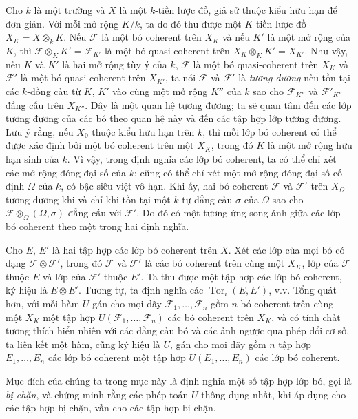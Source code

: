 Cho $k$ là một trường và $X$ là một $k$-tiền lược đồ, giả sử thuộc kiểu hữu hạn
để đơn giản. Với mỗi mở rộng $K/k$, ta do đó thu được một $K$-tiền lược đồ
$X_K=X\otimes_k K$. Nếu $\mathcal F$ là một bó coherent trên $X_K$ và nếu
$K'$ là một mở rộng của $K$, thì
$\mathcal F\otimes_K K'=\mathcal F_{K'}$ là một bó quasi-coherent trên
$X_K\otimes_K K'=X_{K'}$. Như vậy, nếu $K$ và $K'$ là hai mở rộng tùy ý của
$k$, $\mathcal F$ là một bó quasi-coherent trên $X_K$ và $\mathcal F'$
là một bó quasi-coherent trên $X_{K'}$, ta nói $\mathcal F$ và
$\mathcal F'$ là \emph{tương đương} nếu tồn tại các $k$-đồng cấu từ $K$,
$K'$ vào cùng một mở rộng $K''$ của $k$ sao cho $\mathcal F_{K''}$ và
$\mathcal F'_{K''}$ đẳng cấu trên $X_{K''}$. Đây là một quan hệ tương đương;
ta sẽ quan tâm đến các lớp tương đương của các bó theo quan hệ này và đến các
tập hợp lớp tương đương. Lưu ý rằng, nếu $X_0$ thuộc kiểu hữu hạn trên
$k$, thì mỗi lớp bó coherent có thể được xác định bởi một bó coherent trên
một $X_K$, trong đó $K$ là một mở rộng hữu hạn sinh của $k$. Vì vậy, trong
định nghĩa các lớp bó coherent, ta có thể chỉ xét các mở rộng đóng đại số của
$k$; cũng có thể chỉ xét một mở rộng đóng đại số cố định $\Omega$ của $k$, có
bậc siêu việt vô hạn. Khi ấy, hai bó coherent $\mathcal F$ và $\mathcal F'$
trên $X_\Omega$ tương đương khi và chỉ khi tồn tại một $k$-tự đẳng cấu $\sigma$
của $\Omega$ sao cho $\mathcal F\otimes_\Omega(\Omega,\sigma)$ đẳng cấu với
$\mathcal F'$. Do đó có một tương ứng song ánh giữa các lớp bó coherent theo
một trong hai định nghĩa.

Cho $E$, $E'$ là hai tập hợp các lớp bó coherent trên $X$. Xét các lớp của mọi
bó có dạng $\mathcal F\otimes\mathcal F'$, trong đó $\mathcal F$ và
$\mathcal F'$ là các bó coherent trên cùng một $X_K$, lớp của $\mathcal F$
thuộc $E$ và lớp của $\mathcal F'$ thuộc $E'$. Ta thu được một tập hợp các lớp
bó coherent, ký hiệu là $E\otimes E'$. Tương tự, ta định nghĩa các
$\operatorname{Tor}_i(E,E')$, v.v. Tổng quát hơn, với mỗi hàm $U$ gán cho mọi
dãy $\mathcal F_1,\ldots,\mathcal F_n$ gồm $n$ bó coherent trên cùng một $X_K$
một tập hợp $U(\mathcal F_1,\ldots,\mathcal F_n)$ các bó coherent trên $X_K$,
và có tính chất tương thích hiển nhiên với các đẳng cấu bó và các ảnh ngược qua
phép đổi cơ sở, ta liên kết một hàm, cũng ký hiệu là $U$, gán cho mọi dãy gồm
$n$ tập hợp $E_1,\ldots,E_n$ các lớp bó coherent một tập hợp
$U(E_1,\ldots,E_n)$ các lớp bó coherent.

Mục đích của chúng ta trong mục này là định nghĩa một số tập hợp lớp bó, gọi là
\emph{bị chặn}, và chứng minh rằng các phép toán $U$ thông dụng nhất, khi áp
dụng cho các tập hợp bị chặn, vẫn cho các tập hợp bị chặn.

